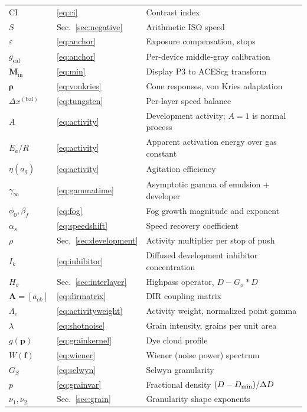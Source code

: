 \begin{table}[htbp]
\begin{center}
\begin{tabularx}{\columnwidth}{@{}ll>{\raggedright\arraybackslash}X@{}}
$\mathrm{CI}$ & \eqref{eq:ci} & Contrast index \\
$S$ & Sec.~\ref{sec:negative} & Arithmetic ISO speed \\
$\varepsilon$ & \eqref{eq:anchor} & Exposure compensation, stops \\
$g_{\mathrm{cal}}$ & \eqref{eq:anchor} & Per-device middle-gray calibration \\
$\mathbf{M}_{\mathrm{in}}$ & \eqref{eq:min} & Display P3 to ACEScg transform \\
$\boldsymbol{\rho}$ & \eqref{eq:vonkries} & Cone responses, von Kries adaptation \\
$\Delta x^{\mathrm{(bal)}}$ & \eqref{eq:tungsten} & Per-layer speed balance \\
$A$ & \eqref{eq:activity} & Development activity; $A = 1$ is normal process \\
$E_a/R$ & \eqref{eq:activity} & Apparent activation energy over gas constant \\
$\eta(a_g)$ & \eqref{eq:activity} & Agitation efficiency \\
$\gamma_\infty$ & \eqref{eq:gammatime} & Asymptotic gamma of emulsion + developer \\
$\phi_0, \beta_f$ & \eqref{eq:fog} & Fog growth magnitude and exponent \\
$\alpha_s$ & \eqref{eq:speedshift} & Speed recovery coefficient \\
$\rho$ & Sec.~\ref{sec:development} & Activity multiplier per stop of push \\
$I_k$ & \eqref{eq:inhibitor} & Diffused development inhibitor concentration \\
$H_\sigma$ & Sec.~\ref{sec:interlayer} & Highpass operator, $D - G_\sigma * D$ \\
$\mathbf{A} = [a_{ck}]$ & \eqref{eq:dirmatrix} & DIR coupling matrix \\
$\Lambda_c$ & \eqref{eq:activityweight} & Activity weight, normalized point gamma \\
$\lambda$ & \eqref{eq:shotnoise} & Grain intensity, grains per unit area \\
$g(\mathbf{p})$ & \eqref{eq:grainkernel} & Dye cloud profile \\
$W(\mathbf{f})$ & \eqref{eq:wiener} & Wiener (noise power) spectrum \\
$G_S$ & \eqref{eq:selwyn} & Selwyn granularity \\
$p$ & \eqref{eq:grainvar} & Fractional density $(D - D_{\min})/\Delta D$ \\
$\nu_1, \nu_2$ & Sec.~\ref{sec:grain} & Granularity shape exponents \\

\end{tabularx}
\end{center}
\end{table}
